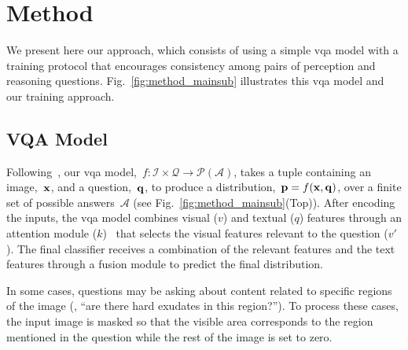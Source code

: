\section{Method}
\label{sec:mainsub_method}

We present here our approach, which consists of using a simple \gls{vqa} model with a training protocol that encourages consistency among pairs of perception and reasoning questions. Fig.~\ref{fig:method_mainsub} illustrates this \gls{vqa} model and our training approach.

\subsection{VQA Model} Following~\cite{cadene2019rubi}, our \gls{vqa} model,~$f:\mathcal{I}\times\mathcal{Q}\to \mathcal{P}(\mathcal{A})$, takes a tuple containing an image,~$\mathbf{x}$, and a question,~$\mathbf{q}$, to produce a distribution,~$\mathbf{p}=f(\mathbf{x},\mathbf{q})$, over a finite set of possible answers~$\mathcal{A}$ (see Fig.~\ref{fig:method_mainsub}(Top)). After encoding the inputs, the \gls{vqa} model combines visual ($v$) and textual ($q$) features through an attention module ($k$)~\cite{xu2015show} that selects the visual features relevant to the question ($v'$). The final classifier receives a combination of the relevant features and the text features through a fusion module to predict the final distribution.

In some cases, questions may be asking about content related to specific regions of the image (\eg, ``are there hard exudates in this region?''). To process these cases, the input image is masked so that the visible area corresponds to the region mentioned in the question while the rest of the image is set to zero.

